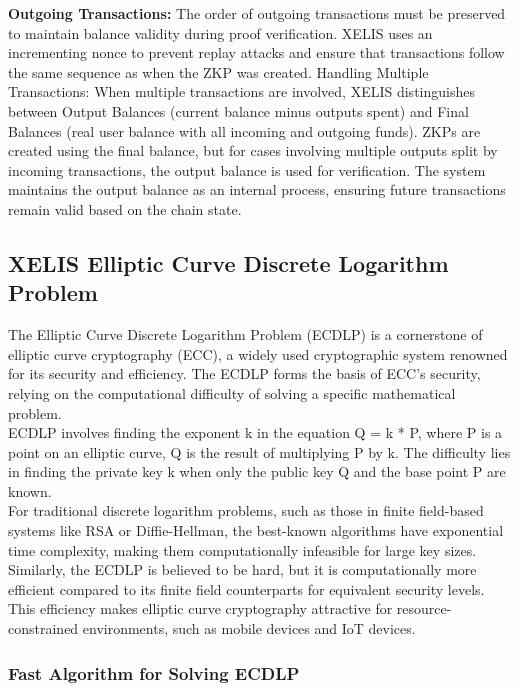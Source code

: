 \documentclass[10pt,a4paper,twocolumn]{article}
\begin{document}
\textbf{Outgoing Transactions:} The order of outgoing transactions must be preserved to maintain balance validity during proof verification. XELIS uses an incrementing nonce to prevent replay attacks and ensure that transactions follow the same sequence as when the ZKP was created.
Handling Multiple Transactions: When multiple transactions are involved, XELIS distinguishes between Output Balances (current balance minus outputs spent) and Final Balances (real user balance with all incoming and outgoing funds). ZKPs are created using the final balance, but for cases involving multiple outputs split by incoming transactions, the output balance is used for verification. The system maintains the output balance as an internal process, ensuring future transactions remain valid based on the chain state.\\

\subsection{XELIS Elliptic Curve Discrete Logarithm Problem}

The Elliptic Curve Discrete Logarithm Problem (ECDLP) is a cornerstone of elliptic curve cryptography (ECC), a widely used cryptographic system renowned for its security and efficiency. The ECDLP forms the basis of ECC's security, relying on the computational difficulty of solving a specific mathematical problem.\\

ECDLP involves finding the exponent k in the equation Q = k * P, where P is a point on an elliptic curve, Q is the result of multiplying P by k. The difficulty lies in finding the private key k when only the public key Q and the base point P are known.\\

For traditional discrete logarithm problems, such as those in finite field-based systems like RSA or Diffie-Hellman, the best-known algorithms have exponential time complexity, making them computationally infeasible for large key sizes. Similarly, the ECDLP is believed to be hard, but it is computationally more efficient compared to its finite field counterparts for equivalent security levels. This efficiency makes elliptic curve cryptography attractive for resource-constrained environments, such as mobile devices and IoT devices.\\

\subsubsection{Fast Algorithm for Solving ECDLP}
\end{document}
